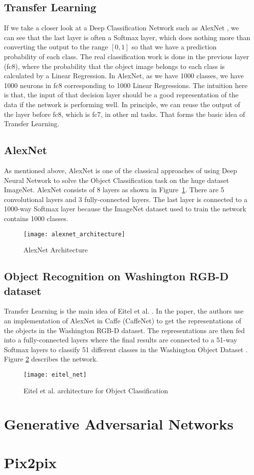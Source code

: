 \subsection{Transfer Learning}
If we take a closer look at a Deep Classification Network such as AlexNet , we can see that the last layer is often a Softmax layer, which does nothing more
than converting the output to the range $[0, 1]$ so that we have a prediction probability
of each class. The real classification work is done in the previous layer (fc8), where the
probability that the object image belongs to each class is calculated by a Linear
Regression. In AlexNet, as we have 1000 classes, we have 1000 neurons in fc8 corresponding
to 1000 Linear Regressions. The intuition here is that, the input of that decision layer
should be a good representation of the data if the network is performing well. In
principle, we can reuse the output of the layer before fc8, which is fc7, in other
\acrshort{ml} tasks. That forms the basic idea of Transfer Learning.

\subsection{AlexNet}
As mentioned above, AlexNet is one of the classical approaches of using Deep Neural
Network to solve the Object Classification task on the huge dataset ImageNet.  AlexNet
consists of 8 layers as shown in Figure~\ref{fig:alexnet}. There are 5 convolutional
layers and 3 fully-connected layers. The last layer is connected to a 1000-way Softmax
layer because the ImageNet dataset  used to train the network contains
1000 classes.

\begin{figure}[htb]
  \centering
  \texttt{[image: alexnet\_architecture]}
  \caption{AlexNet Architecture}\label{fig:alexnet}
\end{figure}

\subsection{Object Recognition on Washington RGB-D dataset }
Transfer Learning is the main idea of Eitel et al. . In the paper, the
authors use an implementation of AlexNet in Caffe (CaffeNet) to get the representations of
the objects in the Washington RGB-D dataset. The representations are then fed into a
fully-connected layers where the final results are connected to a 51-way Softmax layers to
classify 51 different classes in the Washington Object Dataset .
Figure \ref{fig:eitel_net} describes the network.

\begin{figure}[htb]
  \centering
  \texttt{[image: eitel\_net]}
  \caption{Eitel et al. architecture for Object Classification}\label{fig:eitel_net}
\end{figure}

\section{Generative Adversarial Networks}
\section{Pix2pix}

